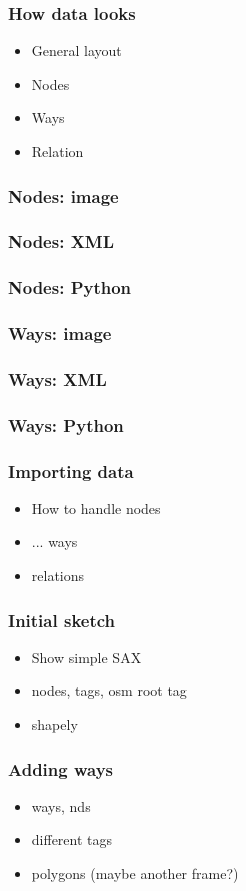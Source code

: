 \documentclass{beamer}
\begin{document}
\begin{frame}
  \frametitle{How data looks}
  \begin{itemize}
  \item General layout
  \item Nodes
  \item Ways
  \item Relation
  \end{itemize}
\end{frame}

\begin{frame}
  \frametitle{Nodes: image}
\end{frame}

\begin{frame}
  \frametitle{Nodes: XML}
\end{frame}

\begin{frame}
  \frametitle{Nodes: Python}
\end{frame}


\begin{frame}
  \frametitle{Ways: image}
\end{frame}

\begin{frame}
  \frametitle{Ways: XML}
\end{frame}

\begin{frame}
  \frametitle{Ways: Python}
\end{frame}


\begin{frame}
  \frametitle{Importing data}
  \begin{itemize}
  \item How to handle nodes
  \item ... ways
  \item relations
  \end{itemize}
\end{frame}

\begin{frame}
  \frametitle{Initial sketch}
  \begin{itemize}
  \item Show simple SAX
  \item nodes, tags, osm root tag
  \item shapely
  \end{itemize}
\end{frame}

\begin{frame}
  \frametitle{Adding ways}
  \begin{itemize}
  \item ways, nds
  \item different tags
  \item polygons (maybe another frame?)
  \end{itemize}
\end{frame}
\end{document}
